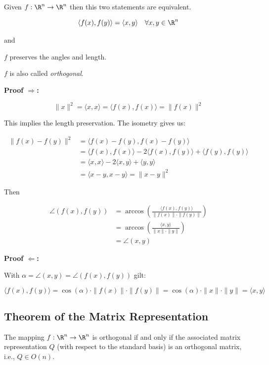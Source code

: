 Given \(f: \R^n \to \R^n\) then this two statements are equivalent.

\[
    \langle f(x), f(y) \rangle = \langle x, y \rangle \quad \forall x,y \in \R^n
\]

and 

\(f\) preserves the angles and length.

\(f\) is also called \emph{orthogonal}.

\textbf{Proof \(\Rightarrow\):}
 
\[
    \|x\|^2 = \langle x, x \rangle = \langle f(x), f(x) \rangle = \|f(x)\|^2
\]

This implies the length preservation. The isometry gives us:

\begin{align*}
    \|f(x) - f(y)\|^2 
    &= \langle f(x) - f(y), f(x) - f(y) \rangle \\
    &= \langle f(x), f(x) \rangle - 2\langle f(x), f(y) \rangle + \langle f(y), f(y) \rangle \\
    &= \langle x, x \rangle - 2\langle x, y \rangle + \langle y, y \rangle \\
    &= \langle x - y, x - y \rangle = \|x - y\|^2
\end{align*}

Then

\begin{align*}
    \angle(f(x), f(y)) 
    &= \arccos\left( \frac{\langle f(x), f(y) \rangle}{\|f(x)\| \cdot \|f(y)\|} \right) \\
    &= \arccos\left( \frac{\langle x, y \rangle}{\|x\| \cdot \|y\|} \right) \\
    &= \angle(x, y)
\end{align*}

\QED

\textbf{Proof \(\Leftarrow\):} 

With \(\alpha = \angle(x, y) = \angle(f(x), f(y))\) gilt:

\[
    \langle f(x), f(y) \rangle = \cos(\alpha) \cdot \|f(x)\| \cdot \|f(y)\| = \cos(\alpha) 
    \cdot \|x\| \cdot \|y\| = \langle x, y \rangle
\]

\QED

\subsection{Theorem of the Matrix Representation}

The mapping \( f : \R^n \to \R^n \) is orthogonal if and only if  
the associated matrix representation \( Q \) (with respect to the standard basis) is an orthogonal matrix, i.e., \( Q \in O(n) \).

